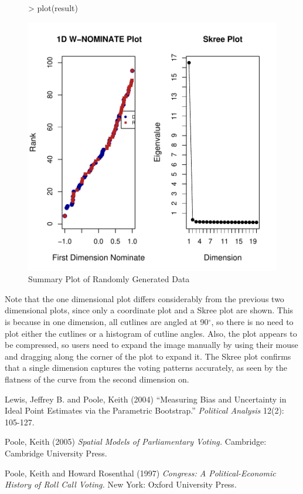\documentclass[12pt]{article}
\begin{document}
\begin{figure}
\begin{center}
\begin{Schunk}
\begin{Sinput}
> plot(result)
\end{Sinput}
\end{Schunk}
\includegraphics{wnominate-random3}
\end{center}
\caption{Summary Plot of Randomly Generated Data}
\label{fig:four}
\end{figure}

Note that the one dimensional plot differs considerably from the previous two dimensional
plots, since only a coordinate plot and a Skree plot are shown.  This is because in one
dimension, all cutlines are angled at 90$^\circ$, so there is no need to plot either the
cutlines or a histogram of cutline angles.  Also, the plot appears to be compressed,
so users need to expand the image manually by using their mouse and dragging along
the corner of the plot to expand it.  The Skree plot confirms that a single dimension captures
the voting patterns accurately, as seen by the flatness of the curve from the second
dimension on.

\newpage
\begin{thebibliography}{3}

 Lewis, Jeffrey B. and Poole, Keith (2004)
``Measuring Bias and Uncertainty in Ideal Point Estimates via the Parametric Bootstrap.''
\emph{Political Analysis} 12(2): 105-127.

 Poole, Keith (2005)
\emph{Spatial Models of Parliamentary Voting.}
Cambridge: Cambridge University Press.

 Poole, Keith and Howard Rosenthal (1997)
\emph{Congress: A Political-Economic History of Roll Call Voting.}
New York: Oxford University Press.

\end{thebibliography}
\end{document}
